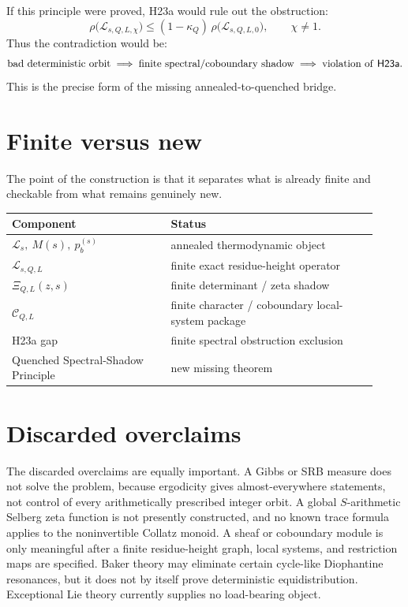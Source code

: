 \documentclass[11pt]{article}
\newcommand{\Lcal}{\mathcal{L}}
\newcommand{\Ccal}{\mathscr{C}}
\theoremstyle{remark}
\begin{document}
If this principle were proved, \textsf{H23a} would rule out the obstruction:
\[
\rho\bigl(\Lcal_{s,Q,L,\chi}\bigr) \le (1-\kappa_Q)\,\rho\bigl(\Lcal_{s,Q,L,0}\bigr),
\qquad \chi\ne 1.
\]
Thus the contradiction would be:
\[
\text{bad deterministic orbit}
\;\Longrightarrow\;
\text{finite spectral/coboundary shadow}
\;\Longrightarrow\;
\text{violation of \textsf{H23a}}.
\]
This is the precise form of the missing annealed-to-quenched bridge.

\section{Finite versus new}

The point of the construction is that it separates what is already finite and checkable
from what remains genuinely new.

\begin{center}
\renewcommand{\arraystretch}{1.3}
\begin{tabular}{@{}p{0.40\linewidth} p{0.52\linewidth}@{}}
\toprule
\textbf{Component} & \textbf{Status}\\
\midrule
$\Lcal_s,\ M(s),\ p_b^{(s)}$ & annealed thermodynamic object\\
$\Lcal_{s,Q,L}$ & finite exact residue-height operator\\
$\Xi_{Q,L}(z,s)$ & finite determinant / zeta shadow\\
$\Ccal_{Q,L}$ & finite character / coboundary local-system package\\
\textsf{H23a} gap & finite spectral obstruction exclusion\\
Quenched Spectral-Shadow Principle & new missing theorem\\
\bottomrule
\end{tabular}
\end{center}

\section{Discarded overclaims}

The discarded overclaims are equally important. A Gibbs or SRB measure does not solve the
problem, because ergodicity gives almost-everywhere statements, not control of every
arithmetically prescribed integer orbit. A global $S$-arithmetic Selberg zeta function is
not presently constructed, and no known trace formula applies to the noninvertible Collatz
monoid. A sheaf or coboundary module is only meaningful after a finite residue-height graph,
local systems, and restriction maps are specified. Baker theory may eliminate certain
cycle-like Diophantine resonances, but it does not by itself prove deterministic
equidistribution. Exceptional Lie theory currently supplies no load-bearing object.
\end{document}
